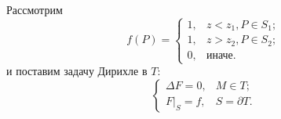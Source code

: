 \documentclass{article}
\begin{document}
Рассмотрим 
\[
f(P) = 
	\begin{cases}
	1, & z < z_1, P \in S_1;\\
	1, & z > z_2, P \in S_2;\\
	0, & \text{иначе}.
	\end{cases}
\]
и поставим задачу Дирихле в $T$:
\[
\begin{cases}
\Delta F = 0, & M \in T;\\
F \bigg|_S = f, & S = \partial T.
\end{cases}
\]
\end{document}
